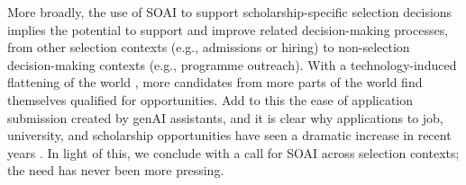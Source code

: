 More broadly, the use of SOAI to support scholarship-specific selection decisions implies the potential to support and improve related decision-making processes, from other selection contexts (e.g., admissions or hiring) to non-selection decision-making contexts (e.g., programme outreach). With a technology-induced flattening of the world \cite{Friedman_2005}, more candidates from more parts of the world find themselves qualified for opportunities. Add to this the ease of application submission created by genAI assistants, and it is clear why applications to job, university, and scholarship opportunities have seen a dramatic increase in recent years \cite{Kaashoek2024Impact}. In light of this, we conclude with a call for SOAI across selection contexts; the need has never been more pressing.